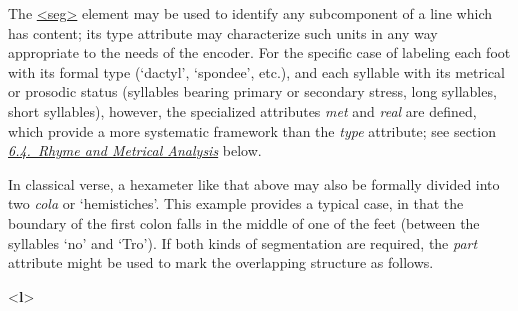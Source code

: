 The \hyperref[TEI.seg]{<seg>} element may be used to identify any subcomponent of a line which has content; its type attribute may characterize such units in any way appropriate to the needs of the encoder. For the specific case of labeling each foot with its formal type (‘dactyl’, ‘spondee’, etc.), and each syllable with its metrical or prosodic status (syllables bearing primary or secondary stress, long syllables, short syllables), however, the specialized attributes {\itshape met} and {\itshape real} are defined, which provide a more systematic framework than the {\itshape type} attribute; see section \textit{\hyperref[VEME]{6.4.\ Rhyme and Metrical Analysis}} below.\par
In classical verse, a hexameter like that above may also be formally divided into two \textit{cola} or ‘hemistiches’. This example provides a typical case, in that the boundary of the first colon falls in the middle of one of the feet (between the syllables ‘no’ and ‘Tro’). If both kinds of segmentation are required, the {\itshape part} attribute might be used to mark the overlapping structure as follows. \par\bgroup{}\exampleFont \begin{shaded}\noindent\mbox{}{<\textbf{l}>}\mbox{}\newline 
{}\mbox{}\newline 

\end{shaded}

